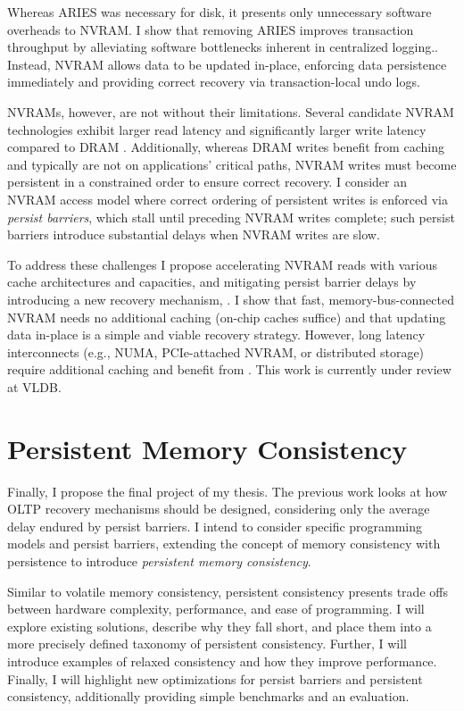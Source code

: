 Whereas ARIES was necessary for disk, it presents only unnecessary software overheads to NVRAM.
I show that removing ARIES improves transaction throughput by alleviating software bottlenecks inherent in centralized logging..
Instead, NVRAM allows data to be updated in-place, enforcing data persistence immediately and providing correct recovery via transaction-local undo logs.

NVRAMs, however, are not without their limitations.
Se\-veral candidate NVRAM technologies exhibit larger read latency and significantly larger write latency compared to DRAM \cite{BurrKurdi08}.
Additionally, whereas DRAM writes benefit from caching and typically are not on applications' critical paths, NVRAM writes must become persistent in a constrained order to ensure correct recovery.
I consider an NVRAM access model where correct ordering of persistent writes is enforced via \emph{persist barriers}, which stall until preceding NVRAM writes complete; such persist barriers introduce substantial delays when NVRAM writes are slow.

To address these challenges I propose accelerating NVRAM reads with various cache architectures and capacities, and mitigating persist barrier delays by introducing a new recovery mechanism, \GroupCommit.
I show that fast, memory-bus-connected NVRAM needs no additional caching (on-chip caches suffice) and that updating data in-place is a simple and viable recovery strategy.
However, long latency interconnects (e.g., NUMA, PCIe-attached NVRAM, or distributed storage) require additional caching and benefit from \GroupCommit.
This work is currently under review at VLDB.

\section{Persistent Memory Consistency}
\label{sec:Intro:PMC}

Finally, I propose the final project of my thesis.
The previous work looks at how OLTP recovery mechanisms should be designed, considering only the average delay endured by persist barriers.
I intend to consider specific programming models and persist barriers, extending the concept of memory consistency with persistence to introduce \emph{persistent memory consistency}.

Similar to volatile memory consistency, persistent consistency presents trade offs between hardware complexity, performance, and ease of programming.
I will explore existing solutions, describe why they fall short, and place them into a more precisely defined taxonomy of persistent consistency.
Further, I will introduce examples of relaxed consistency and how they improve performance.
Finally, I will highlight new optimizations for persist barriers and persistent consistency, additionally providing simple benchmarks and an evaluation.

